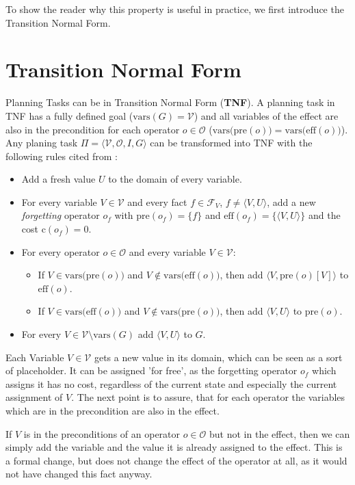 To show the reader why this property is useful in practice, we first introduce the Transition Normal Form.

\section{Transition Normal Form}\label{sec:transition-normal-form}
Planning Tasks can be in Transition Normal Form (\textbf{TNF}). 
A planning task in TNF has a fully defined goal ($\text{vars}(G)=\mathcal{V}$) and all variables of the effect are also in the precondition for each operator $o\in\mathcal{O}$ ($\text{vars(pre}(o)) = \text{vars(eff}(o))$).
Any planing task  $\Pi = \langle \mathcal{V}, \mathcal{O}, I, G \rangle$ can be transformed into TNF with the following rules cited from \cite{fivser2020strengthening}:
\begin{itemize}
    \item Add a fresh value $U$ to the domain of every variable.
    \item For every variable $V\in\mathcal{V}$ and every fact $f\in\mathcal{F}_V$, $f\neq\langle V,U\rangle$, add a new \textit{forgetting} operator $o_f$ with $\text{pre}(o_f)=\{f\}$ and $\text{eff}(o_f)=\{\langle V,U\rangle\}$ and the cost $\text{c}(o_f)=0$.
    \item For every operator $o\in\mathcal{O}$ and every variable $V\in\mathcal{V}$:
    \begin{itemize}
        \item If $V\in\text{vars(pre}(o))$ and $V\notin\text{vars(eff}(o))$, then add $\langle V,\text{pre}(o)[V]\rangle$ to $\text{eff}(o)$.
        \item If $V\in\text{vars(eff}(o))$ and $V\notin\text{vars(pre}(o))$, then add $\langle V,U\rangle$ to $\text{pre}(o)$.
    \end{itemize}
    \item For every $V\in\mathcal{V}\setminus\text{vars}(G)$ add $\langle V,U\rangle$ to $G$.
\end{itemize}

Each Variable $V\in\mathcal{V}$ gets a new value in its domain, which can be seen as a sort of placeholder.
It can be assigned 'for free', as the forgetting operator $o_f$ which assigns it has no cost, regardless of the current state and especially the current assignment of $V$.
The next point is to assure, that for each operator the variables which are in the precondition are also in the effect.

If $V$ is in the preconditions of an operator $o\in\mathcal{O}$ but not in the effect, then we can simply add the variable and the value it is already assigned to the effect.
This is a formal change, but does not change the effect of the operator at all, as it would not have changed this fact anyway.

